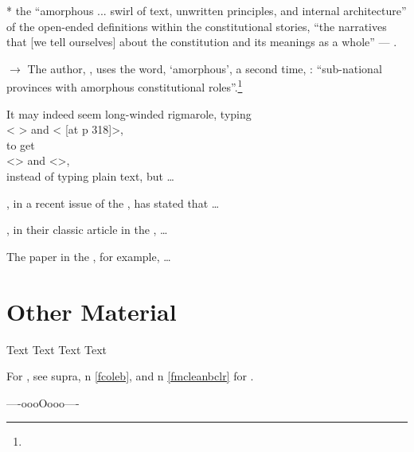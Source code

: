 
* the ``amorphous ... swirl of text,
unwritten principles, and internal architecture'' of the open-ended definitions within the constitutional stories, ``the narratives that [we tell ourselves] about the
constitution and its meanings as a whole''
 --- .\bigskip


$\rightarrow$ The author, , uses the word, `amorphous', a second time, : ``sub-national provinces with
amorphous constitutional roles''.\footnote{}

It may indeed seem long-winded rigmarole, typing\\
<  > and < [at p 318]>,\\ to get\\ <> and <>,\\ instead of typing plain text, but \ldots

, in a recent issue of the , has stated that \ldots

, in their classic article in the , \ldots

The  paper in the , for example, \ldots

\section{Other Material}

Text\autocite[110]{eco} Text\autocite[42]{butt} Text\autocite[para ]{anncrimnsw} Text\autocite[\nopp c 1]{bishop} %

For , see supra, n \ref{fcoleb}, and n \ref{fmcleanbclr} for .
%
\bigskip 

\hfill ----oooOooo---- \hfill\ 




\newpage
{\center
\printbibheading[title=Bibliography]
}
\newrefcontext[sorting=statsort]
\printbibliography[
	title=\center Legislation,
	heading=subbibliography,%
	type=statute,
	]
\newrefcontext[sorting=casesort]
\printbibliography[
	title=\center Jurisprudence,
	heading=subbibliography,%
	type=case,
	]
\newrefcontext[sorting=nty]
\printbibliography[
	heading=subbibliography,%
	keyword=lawbook,
	title={\center Secondary Materials: Monographs},
	]
\printbibliography[
	heading=subbibliography,%
	title={\center Secondary Materials: Articles},
	type=ljarticle,
	]

